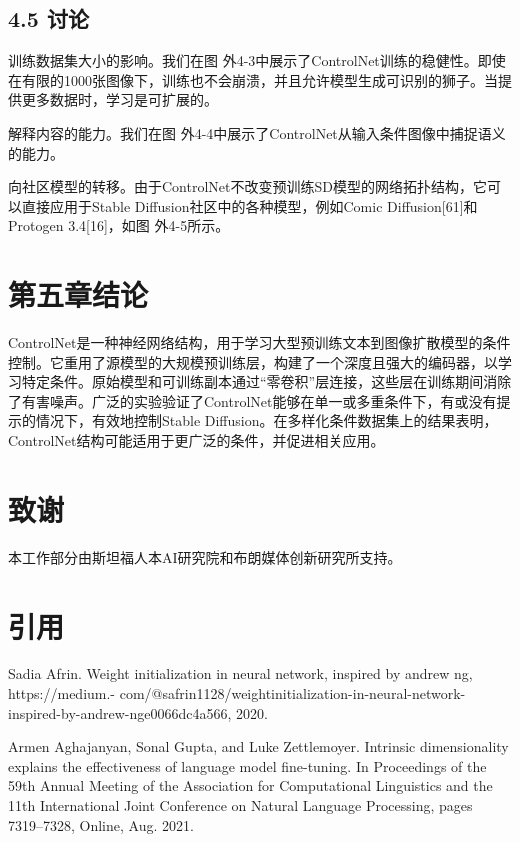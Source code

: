 \documentclass[a4paper,AutoFakeBold,oneside,12pt]{book}
\begin{document}
\begin{nopagenumber}
\section*{4.5\quad{} 讨论}
训练数据集大小的影响。我们在图 外4-3中展示了ControlNet训练的稳健性。即使在有限的1000张图像下，训练也不会崩溃，并且允许模型生成可识别的狮子。当提供更多数据时，学习是可扩展的。

解释内容的能力。我们在图 外4-4中展示了ControlNet从输入条件图像中捕捉语义的能力。

向社区模型的转移。由于ControlNet不改变预训练SD模型的网络拓扑结构，它可以直接应用于Stable Diffusion社区中的各种模型，例如Comic Diffusion[61]和Protogen 3.4[16]，如图 外4-5所示。

\newpage
\chapter*{第五章\quad{}结论}
\newtranschapter
ControlNet是一种神经网络结构，用于学习大型预训练文本到图像扩散模型的条件控制。它重用了源模型的大规模预训练层，构建了一个深度且强大的编码器，以学习特定条件。原始模型和可训练副本通过“零卷积”层连接，这些层在训练期间消除了有害噪声。广泛的实验验证了ControlNet能够在单一或多重条件下，有或没有提示的情况下，有效地控制Stable Diffusion。在多样化条件数据集上的结果表明，ControlNet结构可能适用于更广泛的条件，并促进相关应用。

\newpage
\chapter*{致谢}
\newtranschapter
本工作部分由斯坦福人本AI研究院和布朗媒体创新研究所支持。
\newpage
\chapter*{引用}
\noindent
[1] Sadia Afrin. Weight initialization in neural network, inspired by andrew ng, https://medium.-
\noindent
com/@safrin1128/weightinitialization-in-neural-network-inspired-by-andrew-nge0066dc4a566, 2020.

\noindent
[2] Armen Aghajanyan, Sonal Gupta, and Luke Zettlemoyer. Intrinsic dimensionality explains the effectiveness of language model fine-tuning. In Proceedings of the 59th Annual Meeting of the Association for Computational Linguistics and the 11th International Joint Conference on Natural Language Processing, pages 7319–7328, Online, Aug. 2021.


\end{nopagenumber}
\end{document}
